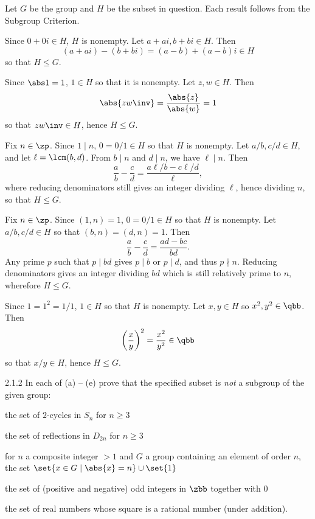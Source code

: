 \begin{sol}
    Let $G$ be the group and $H$ be the subset in question.
    Each result follows from the Subgroup Criterion.
    \begin{subexercises}
        \item Since $0 + 0i \in H$, $H$ is nonempty.
        Let $a + ai, b + bi \in H$.
        Then
        \[
        	(a + ai) - (b + bi) = (a - b) + (a - b)i \in H
        \]
        so that $H \leq G$.
        \item Since $\abs 1 = 1$, $1 \in H$ so that it is nonempty.
        Let $z, w \in H$.
        Then
        \[
        	\abs{zw\inv} = \frac{\abs{z}}{\abs{w}} = 1
        \]
        so that $zw\inv \in H$, hence $H \leq G$.
        \item Fix $n \in \zp$.
        Since $1 \mid n$, $0 = 0/1 \in H$ so that $H$ is nonempty.
        Let $a/b, c/d \in H$, and let $\ell = \lcm(b, d)$.
        From $b \mid n$ and $d \mid n$, we have $\ell \mid n$.
        Then
        \[
            \frac ab - \frac cd = \frac{a\ell/b - c\ell/d}{\ell},
        \]
        where reducing denominators still gives an integer dividing $\ell$, hence dividing $n$, so that $H \leq G$.
        \item Fix $n \in \zp$.
        Since $(1, n) = 1$, $0 = 0/1 \in H$ so that $H$ is nonempty.
        Let $a/b, c/d \in H$ so that $(b, n) = (d, n) = 1$.
        Then
        \[
        	\frac ab - \frac cd = \frac{ad - bc}{bd}.
        \]
        Any prime $p$ such that $p \mid bd$ gives $p \mid b$ or $p \mid d$, and thus $p \nmid n$.
        Reducing denominators gives an integer dividing $bd$ which is still relatively prime to $n$, wherefore $H \leq G$.
        \item Since $1 = 1^2 = 1/1$, $1 \in H$ so that $H$ is nonempty.
        Let $x, y \in H$ so $x^2, y^2 \in \qbb$.
        Then
        \[
        	\left(\frac xy\right)^2 = \frac{x^2}{y^2} \in \qbb
        \]
        so that $x/y \in H$, hence $H \leq G$. \qedhere
    \end{subexercises}
\end{sol}

\begin{exercise}{2.1.2}
    In each of (a) -- (e) prove that the specified subset is \emph{not} a subgroup of the given group:
    \begin{subexercises}
        \item the set of $2$-cycles in $S_n$ for $n \geq 3$
        \item the set of reflections in $D_{2n}$ for $n \geq 3$
        \item for $n$ a composite integer $>1$ and $G$ a group containing an element of order $n$, the set $\set{x \in G \mid \abs{x} = n} \cup \set{1}$
        \item the set of (positive and negative) odd integers in $\zbb$ together with $0$
        \item the set of real numbers whose square is a rational number (under addition).
    \end{subexercises}
\end{exercise}

